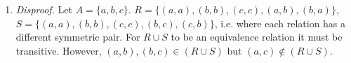 \documentclass{homework}
\begin{document}
\begin{enumerate}
\begin{minipage}[t]{\linewidth}
\begin{proof}
\begin{enumerate}
					\item Additionally, suppose there exists elements $u, v \in A$ where each ordered pair belongs to $R$ and $S$: $(t, u) \wedge (u, v) \implies (t, v)$. Since this is true for $R$ and $S$, it must also exist within the intersection of $R$ and $S$, $(t, u) \in T \wedge (u, v) \in T \implies (t, v) \in T$; thus $T$ is transitive.
				\end{enumerate}
				
			\end{proof}
		\end{minipage}
	
		\item \textit{Disproof.} Let $A = \{ a, b, c \}$. $R=\{(a, a), (b, b), (c, c), (a, b), (b, a)\}$, $S=\{(a, a), (b, b), (c, c), (b, c), (c, b)\}$, i.e. where each relation has a different symmetric pair. For $R \cup S$ to be an equivalence relation it must be transitive. However, $(a, b), (b, c) \in (R \cup S)$ but $(a, c) \notin (R \cup S)$.
	\end{enumerate}
\end{document}
